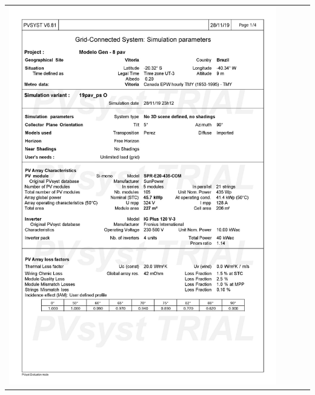 \begin{table}[H]
    \centering
    \begin{tabular}{l}
        \includegraphics[width=0.9\textwidth]{figures/attachments/resultpv33.jpg}
    \end{tabular}
\end{table}
\pagebreak
